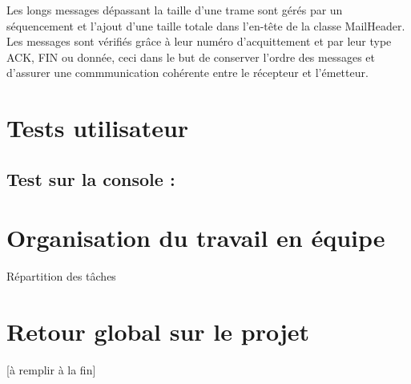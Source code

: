 \documentclass[12pt]{report}
\begin{document}
\bigskip


Les longs messages dépassant la taille d’une trame sont gérés par
un séquencement et l’ajout d'une taille totale dans l’en-tête de la classe MailHeader. \\


Les messages sont vérifiés grâce à leur numéro d'acquittement et par leur type ACK, FIN ou donnée, ceci dans le but de conserver l'ordre des messages et d'assurer une commmunication cohérente entre le récepteur et l'émetteur.


\chapter{Tests utilisateur}
\section{Test sur la console :}



\chapter{Organisation du travail en équipe}
Répartition des tâches



\chapter{Retour global sur le projet}

[à remplir à la fin]
\end{document}

